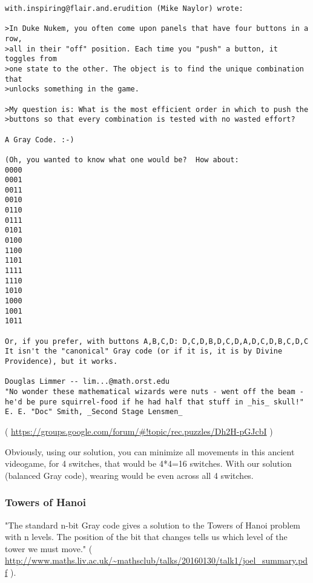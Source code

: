 \begin{lstlisting}
with.inspiring@flair.and.erudition (Mike Naylor) wrote:

>In Duke Nukem, you often come upon panels that have four buttons in a row,
>all in their "off" position. Each time you "push" a button, it toggles from
>one state to the other. The object is to find the unique combination that
>unlocks something in the game.

>My question is: What is the most efficient order in which to push the
>buttons so that every combination is tested with no wasted effort?

A Gray Code. :-)

(Oh, you wanted to know what one would be?  How about:
0000
0001
0011
0010
0110
0111
0101
0100
1100
1101
1111
1110
1010
1000
1001
1011

Or, if you prefer, with buttons A,B,C,D: D,C,D,B,D,C,D,A,D,C,D,B,C,D,C
It isn't the "canonical" Gray code (or if it is, it is by Divine
Providence), but it works.

Douglas Limmer -- lim...@math.orst.edu
"No wonder these mathematical wizards were nuts - went off the beam -
he'd be pure squirrel-food if he had half that stuff in _his_ skull!"
E. E. "Doc" Smith, _Second Stage Lensmen_
\end{lstlisting}

( \url{https://groups.google.com/forum/#!topic/rec.puzzles/Dh2H-pGJcbI} )

Obviously, using our solution, you can minimize all movements in this ancient videogame, for 4 switches, that would be 4*4=16 switches.
With our solution (balanced Gray code), wearing would be even across all 4 switches.

\subsubsection{Towers of Hanoi}

"The standard n-bit Gray code gives a solution to the Towers of Hanoi problem with n levels.
The position of the bit that changes tells us which level of the tower we must move."
( \url{http://www.maths.liv.ac.uk/~mathsclub/talks/20160130/talk1/joel_summary.pdf} ).

